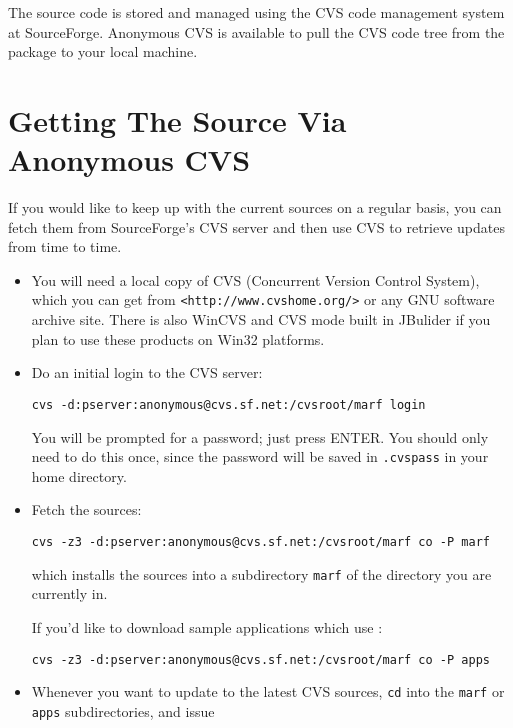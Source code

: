 The {\marf} source code is stored and managed using the
CVS code management system at SourceForge.
Anonymous CVS
is available to pull the CVS code tree from the
{\marf} package to your local machine.

\section{Getting The Source Via Anonymous CVS}

If you would like to keep up with the current sources on a regular
basis, you can fetch them from SourceForge's CVS server
and then use CVS to
retrieve updates from time to time.

\begin{itemize}
\item
     You will need a local copy of CVS
     (Concurrent Version Control System), which you can get from
     \verb+<http://www.cvshome.org/>+ or
     any GNU software archive site. There is also WinCVS and
     CVS mode built in JBulider if you plan to use these products
     on Win32 platforms.

\item
     Do an initial login to the CVS server:

\begin{verbatim}
cvs -d:pserver:anonymous@cvs.sf.net:/cvsroot/marf login
\end{verbatim}

     You will be prompted for a password; just press ENTER.
     You should only need to do this once, since the password will be
     saved in \verb+.cvspass+ in your home directory.

\item
     Fetch the {\marf} sources:

\begin{verbatim}
cvs -z3 -d:pserver:anonymous@cvs.sf.net:/cvsroot/marf co -P marf
\end{verbatim}

     which installs the {\marf} sources into a
     subdirectory \verb+marf+
     of the directory you are currently in.

     If you'd like to download sample applications which use {\marf}:

\begin{verbatim}
cvs -z3 -d:pserver:anonymous@cvs.sf.net:/cvsroot/marf co -P apps
\end{verbatim}


\item
     Whenever you want to update to the latest CVS sources,
     \verb+cd+ into
     the \verb+marf+ or \verb+apps+ subdirectories, and issue


\end{itemize}
